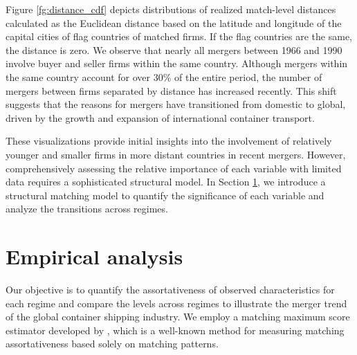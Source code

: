 \documentclass[10pt]{article}
\begin{document}
Figure \ref{fg:distance_cdf} depicts distributions of realized match-level distances calculated as the Euclidean distance based on the latitude and longitude of the capital cities of flag countries of matched firms. If the flag countries are the same, the distance is zero.
We observe that nearly all mergers between 1966 and 1990 involve buyer and seller firms within the same country. 
Although mergers within the same country account for over 30\% of the entire period, the number of mergers between firms separated by distance has increased recently. 
This shift suggests that the reasons for mergers have transitioned from domestic to global, driven by the growth and expansion of international container transport.

These visualizations provide initial insights into the involvement of relatively younger and smaller firms in more distant countries in recent mergers. 
However, comprehensively assessing the relative importance of each variable with limited data requires a sophisticated structural model. 
In Section \ref{sec:empirical_analysis}, we introduce a structural matching model to quantify the significance of each variable and analyze the transitions across regimes.




\section{Empirical analysis}\label{sec:empirical_analysis}

Our objective is to quantify the assortativeness of observed characteristics for each regime and compare the levels across regimes to illustrate the merger trend of the global container shipping industry. 
We employ a matching maximum score estimator developed by \cite{fox2018qe}, which is a well-known method for measuring matching assortativeness based solely on matching patterns.
\end{document}
